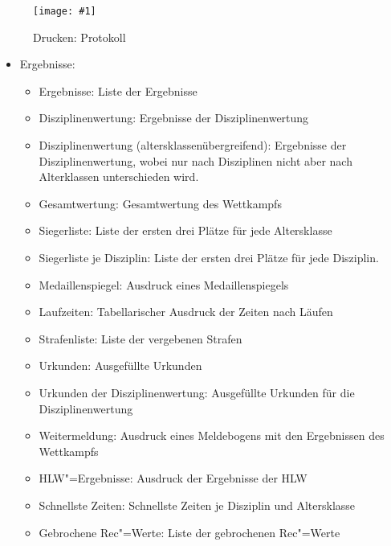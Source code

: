 \documentclass[11pt,a4paper,twoside,ngerman]{article}
\newcommand{\hsmimage}[3]{\begin{figure}[!ht]\centering\texttt{[image: \#1]}\caption{#3}\end{figure}}
\begin{document}
\hsmimage{pics/panel-drucken-protokoll}{.80\textwidth}{Drucken: Protokoll}

\begin{itemize}

\item Ergebnisse:
\begin{itemize}

\item Ergebnisse: Liste der Ergebnisse


\item Disziplinenwertung: Ergebnisse der Disziplinenwertung


\item Disziplinenwertung (altersklassenübergreifend): Ergebnisse der Disziplinenwertung, wobei nur nach Disziplinen nicht aber nach Alterklassen unterschieden wird.


\item Gesamtwertung: Gesamtwertung des Wettkampfs


\item Siegerliste: Liste der ersten drei Plätze für jede Altersklasse


\item Siegerliste je Disziplin: Liste der ersten drei Plätze für jede Disziplin.


\item Medaillenspiegel: Ausdruck eines Medaillenspiegels


\item Laufzeiten: Tabellarischer Ausdruck der Zeiten nach Läufen


\item Strafenliste: Liste der vergebenen Strafen


\item Urkunden: Ausgefüllte Urkunden


\item Urkunden der Disziplinenwertung: Ausgefüllte Urkunden für die Disziplinenwertung


\item Weitermeldung: Ausdruck eines Meldebogens mit den Ergebnissen des Wettkampfs


\item HLW"=Ergebnisse: Ausdruck der Ergebnisse der HLW


\item Schnellste Zeiten: Schnellste Zeiten je Disziplin und Altersklasse


\item Gebrochene Rec"=Werte: Liste der gebrochenen Rec"=Werte


\end{itemize}



\end{itemize}
\end{document}
